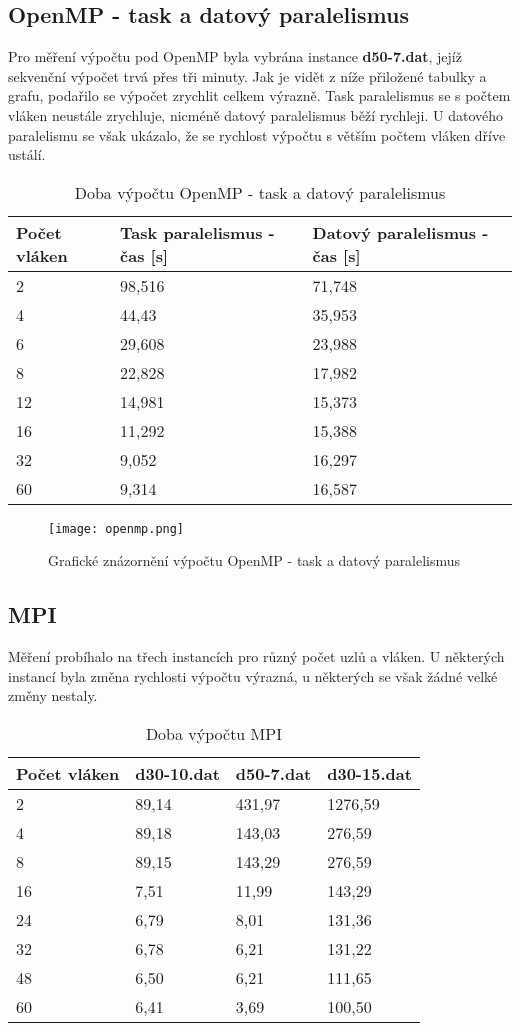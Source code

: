 \documentclass[a4paper, 12pt]{article}
\begin{document}
\subsection{OpenMP - task a datový paralelismus}

Pro měření výpočtu pod OpenMP byla vybrána instance \textbf{d50-7.dat}, jejíž sekvenční výpočet trvá přes tři minuty. Jak je vidět z níže přiložené tabulky a grafu, podařilo se výpočet zrychlit celkem výrazně. Task paralelismus se s počtem vláken neustále zrychluje, nicméně datový paralelismus běží rychleji. U datového paralelismu se však ukázalo, že se rychlost výpočtu s větším počtem vláken dříve ustálí.

\begin{table}[htb]
\centering
\begin{tabular}{|l|l|l|}
\hline
Počet vláken & Task paralelismus - čas {[}s{]} & Datový paralelismus - čas {[}s{]} \\ \hline
2	&	98,516	&	71,748 \\
4	&	44,43	&	35,953 \\
6	&	29,608	&	23,988 \\
8	&	22,828	&	17,982 \\
12	&	14,981	&	15,373 \\
16	&	11,292	&	15,388 \\
32	&	9,052	&	16,297 \\
60	&	9,314	&	16,587 \\ \hline
\end{tabular}
\caption{Doba výpočtu OpenMP - task a datový paralelismus}
\end{table}

\begin{figure}[!htb]
\centering
\texttt{[image: openmp.png]}
\caption{Grafické znázornění výpočtu OpenMP - task a datový paralelismus}
\end{figure}

\subsection{MPI}

Měření probíhalo na třech instancích pro různý počet uzlů a vláken. U některých instancí byla změna rychlosti výpočtu výrazná, u některých se však žádné velké změny nestaly.

\begin{table}[htb]
\centering
\begin{tabular}{|l|l|l|l|}
\hline
Počet vláken & d30-10.dat & d50-7.dat & d30-15.dat \\ \hline
2	& 89,14	&	431,97	&	1276,59 \\
4	& 89,18	&	143,03	&	276,59 \\
8	& 89,15	&	143,29	&	276,59 \\
16	& 7,51	&	11,99	&	143,29 \\
24	& 6,79	&	8,01	&	131,36 \\
32	& 6,78	&	6,21	&	131,22 \\
48	& 6,50	&	6,21	&	111,65 \\
60	& 6,41	&	3,69	&	100,50 \\ \hline
\end{tabular}
\caption{Doba výpočtu MPI}
\end{table}
\end{document}
